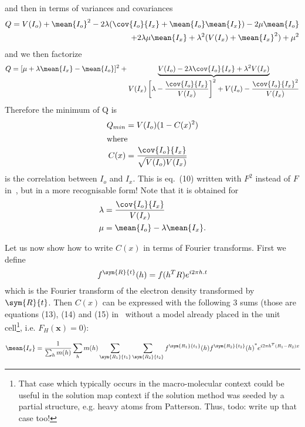 \documentclass[11pt]{article}
\begin{document}
and then in terms of variances and covariances
\begin{equation*}
\begin{split}
Q = V(I_o) + \mean{I_o}^2 -2\lambda(\cov{I_o}{I_x} + \mean{I_o}\mean{I_x}) -2\mu\mean{I_o}
\\
+2\lambda\mu \mean{I_x} + \lambda^2(V(I_x) + \mean{I_x}^2) + \mu^2
\end{split}
\end{equation*}
and we then factorize
\begin{equation*}
Q = [\mu + \lambda \mean{I_x} - \mean{I_o}]^2 + \underbrace{V(I_o) - 2\lambda\cov{I_o}{I_x} + \lambda^2V(I_x)}_{\displaystyle V(I_x)\left[\lambda - \frac{\cov{I_o}{I_x}}{V(I_x)}\right]^2 + V(I_o) - \frac{\cov{I_o}{I_x}^2}{V(I_x)}}
\end{equation*}
Therefore the minimum of Q is
\begin{align}
Q_{min} &= V(I_o)(1-C(x)^2)\\
\intertext{where}
C(x) &= \frac{\cov{I_o}{I_x}}{\sqrt{V(I_o)V(I_x)}}
\end{align}
is the correlation between $I_o$ and $I_x$. This is eq.~(10) written with $F^2$ instead of $F$ in~\cite{J.Navaza:1995}, but in a more recognisable form! Note that it is obtained for
\begin{align}
\lambda &= \frac{\cov{I_o}{I_x}}{V(I_x)}\\
\mu &= \mean{I_o} - \lambda\mean{I_x}. 
\end{align}

Let us now show how to write $C(x)$ in terms of Fourier transforms. First we define
\begin{equation}
f^{\sym{R}{t}}(h) = f(h^T R) e^{i2\pi h.t}
\end{equation}
which is the Fourier transform of the electron density transformed by $\sym{R}{t}$.
Then $C(x)$ can be expressed with the following 3 sums (those are equations (13), (14) and (15) in~\cite{J.Navaza:1995} without a model already placed in the unit cell\footnote{That case which typically occurs in the macro-molecular context could be useful in the solution map context if the solution method was seeded by a partial structure, e.g. heavy atoms from Patterson. Thus, todo: write up that case too!}, i.e. $F_H(\mathbf{x}) = 0$):

\begin{equation}
\mean{I_x} = \frac{1}{\sum_h m(h)}\sum_h m(h) \sum_{\sym{R_1}{t_1}} \sum_{\sym{R_2}{t_2}} f^{\sym{R_1}{t_1}}(h) {f^{\sym{R_2}{t_2}}(h)}^* e^{i2\pi h^T (R_1 - R_2)x} 
\label{eqn:meanIx}
\end{equation}
\end{document}
